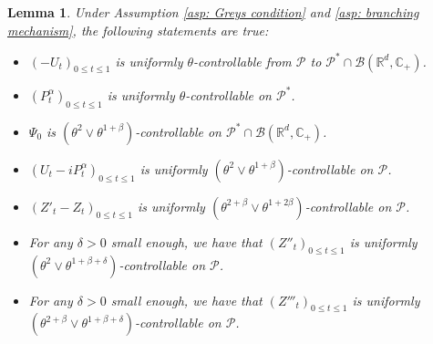 \documentclass[12pt,a4paper]{amsart}
\theoremstyle{plain}
\newtheorem{lem}[thm]{Lemma}
\theoremstyle{definition}
\numberwithin{equation}{section}
\begin{document}
\begin{lem}
\label{lem: upper bound for usgx}
        Under Assumption \ref{asp: Greys condition} and \ref{asp: branching mechanism}, the following statements are true:
\begin{itemize}
\item[(1)]
    $(-U_t)_{0\leq t\leq 1}$ is uniformly $\theta$-controllable from $\mathcal P$ to $\mathcal P^*\cap \mathcal B(\mathbb R^d, \mathbb C_+)$.
\item[(2)]
    $(P^\alpha_t)_{0\leq t\leq 1}$ is uniformly $\theta$-controllable on $\mathcal P^*$.
\item[(3)]
       $\Psi_0$ is $(\theta^2\vee \theta^{1+\beta})$-controllable on $\mathcal P^* \cap \mathcal B(\mathbb R^d, \mathbb C_+)$.
\item[(4)]
    $(U_t- iP_t^{\alpha})_{0\leq t\leq 1}$ is uniformly $(\theta^2\vee \theta^{1+\beta})$-controllable on $\mathcal P$.
\item[(5)]
        $(Z'_t-Z_t)_{0\leq t\leq 1}$ is uniformly $(\theta^{2+\beta}\vee \theta^{1+2\beta})$-controllable on $\mathcal P$.
\item[(6)]
        For any $\delta > 0$ small enough, we have that $(Z''_t)_{0\leq t\leq 1}$ is uniformly $(\theta^2\vee \theta^{1+\beta+\delta})$-controllable on $\mathcal P$.
\item[(7)]
       For any $\delta > 0$ small enough, we have that $(Z'''_t)_{0\leq t\leq 1}$ is uniformly $(\theta^{2+\beta}\vee \theta^{1+\beta+\delta})$-controllable on $\mathcal P$.
\end{itemize}
\end{lem}
\end{document}
